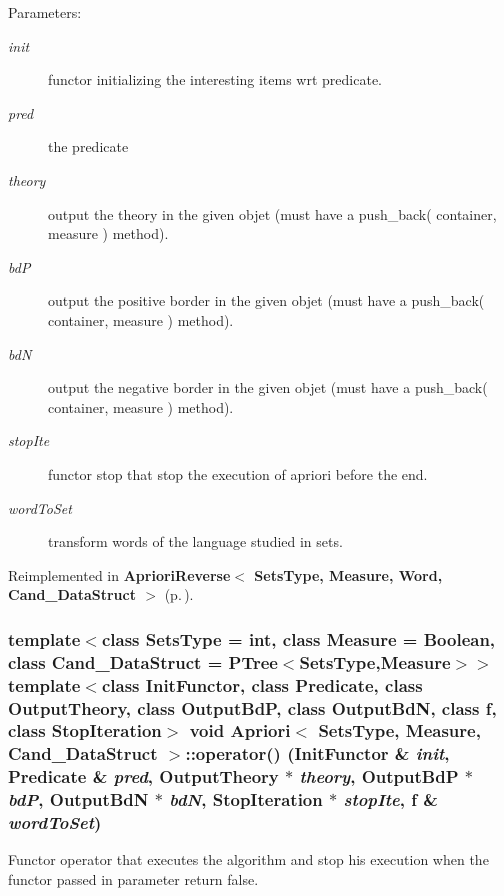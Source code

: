 \begin{Desc}
\item[Parameters:]
\begin{description}
\item[{\em init}]functor initializing the interesting items wrt predicate. \item[{\em pred}]the predicate \item[{\em theory}]output the theory in the given objet (must have a push\_\-back( container, measure ) method). \item[{\em bd\-P}]output the positive border in the given objet (must have a push\_\-back( container, measure ) method). \item[{\em bd\-N}]output the negative border in the given objet (must have a push\_\-back( container, measure ) method). \item[{\em stop\-Ite}]functor stop that stop the execution of apriori before the end. \item[{\em word\-To\-Set}]transform words of the language studied in sets. \end{description}
\end{Desc}


Reimplemented in {\bf Apriori\-Reverse$<$ Sets\-Type, Measure, Word, Cand\_\-Data\-Struct $>$} {\rm (p.\,\pageref{class_apriori_reverse_a8018f226acaaa0047cf1386ed189e08})}.
\subsubsection{\setlength{\rightskip}{0pt plus 5cm}template$<$class Sets\-Type = int, class Measure = Boolean, class Cand\_\-Data\-Struct = PTree$<$Sets\-Type,Measure$>$$>$ template$<$class Init\-Functor, class Predicate, class Output\-Theory, class Output\-Bd\-P, class Output\-Bd\-N, class f, class Stop\-Iteration$>$ void {\bf Apriori}$<$ Sets\-Type, Measure, Cand\_\-Data\-Struct $>$::operator() (Init\-Functor \& {\em init}, {\bf Predicate} \& {\em pred}, Output\-Theory $\ast$ {\em theory}, Output\-Bd\-P $\ast$ {\em bd\-P}, Output\-Bd\-N $\ast$ {\em bd\-N}, Stop\-Iteration $\ast$ {\em stop\-Ite}, f \& {\em word\-To\-Set})\hspace{0.3cm}{\tt  [inline]}}\label{class_apriori_4ccc3fe5ae7ecaa9efffcdc41d1888ed}


Functor operator that executes the algorithm and stop his execution when the functor passed in parameter return false. 

